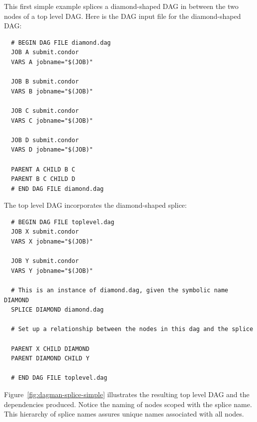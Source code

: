 This first simple example splices a diamond-shaped DAG in
between the two nodes of a top level DAG.
Here is the DAG input file for the diamond-shaped DAG:

\begin{verbatim}
  # BEGIN DAG FILE diamond.dag
  JOB A submit.condor
  VARS A jobname="$(JOB)"

  JOB B submit.condor
  VARS B jobname="$(JOB)"

  JOB C submit.condor
  VARS C jobname="$(JOB)"

  JOB D submit.condor
  VARS D jobname="$(JOB)"

  PARENT A CHILD B C
  PARENT B C CHILD D
  # END DAG FILE diamond.dag
\end{verbatim}

The top level DAG incorporates the diamond-shaped splice:

\begin{verbatim}
  # BEGIN DAG FILE toplevel.dag
  JOB X submit.condor
  VARS X jobname="$(JOB)"

  JOB Y submit.condor
  VARS Y jobname="$(JOB)"

  # This is an instance of diamond.dag, given the symbolic name DIAMOND
  SPLICE DIAMOND diamond.dag

  # Set up a relationship between the nodes in this dag and the splice

  PARENT X CHILD DIAMOND
  PARENT DIAMOND CHILD Y

  # END DAG FILE toplevel.dag
\end{verbatim}

Figure~\ref{fig:dagman-splice-simple} illustrates the resulting
top level DAG and the dependencies produced. 
Notice the naming of nodes
scoped with the splice name.
This hierarchy of splice names assures unique names associated with all nodes.

